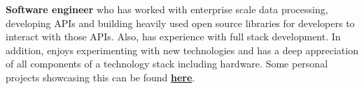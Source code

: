 
\begin{cvparagraph}
\textbf{Software engineer} who has worked with enterprise scale data processing, developing APIs and building heavily used open source libraries for developers to interact with those APIs. Also, has experience with full stack development. In addition, enjoys experimenting with new technologies and has a deep appreciation of all components of a technology stack including hardware. Some personal projects showcasing this can be found \href{https://sujaygarlanka.com/projects.html}{\textbf{\color{awesome}here}}.
\end{cvparagraph}

